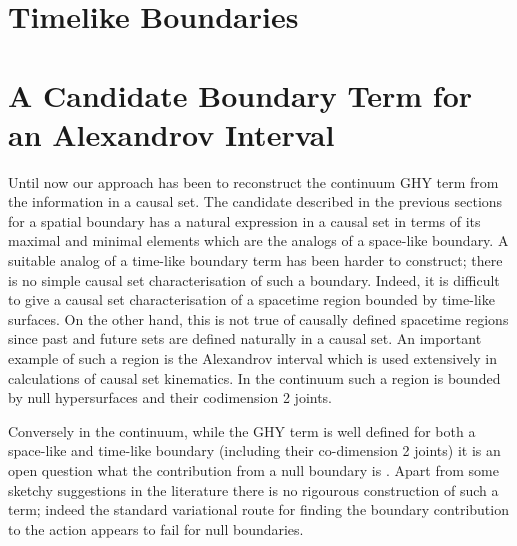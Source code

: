 \documentclass[12pt]{article}
\begin{document}
\section{Timelike Boundaries}





\section{A Candidate Boundary Term for an Alexandrov Interval}
\newcommand{\vol}{\mathrm{vol}}

Until now our approach has been to reconstruct the  continuum GHY term  from the information in a causal set. 
The candidate described in the previous sections for a spatial boundary has a natural expression in a causal set  in  terms of its maximal and minimal elements which are the  analogs of a  space-like boundary.  A suitable analog  of  a time-like boundary  term has been harder to  construct; there is no simple causal set  characterisation of such  a boundary. Indeed, it is difficult to give a causal set  characterisation of a  spacetime region bounded by time-like surfaces. On the other hand, this is not true of causally defined spacetime regions since  past and future sets are defined naturally in  a causal set. An important example of such a region is the  Alexandrov interval which is used extensively  in calculations of causal set kinematics.  In the continuum such a region  is bounded by null hypersurfaces and their codimension 2 joints.  

Conversely in the continuum,   while the GHY term  is well defined for both a space-like and time-like boundary  (including their co-dimension 2 joints)  it is an open question what the contribution from a null  boundary  is \cite{Gibbons_Hawking_Boundary, Harris}. Apart from some sketchy suggestions in the literature \cite{neiman} there is no rigourous construction of such a term; indeed the standard variational route for finding the boundary contribution to the action appears to fail for null boundaries. 
\end{document}
